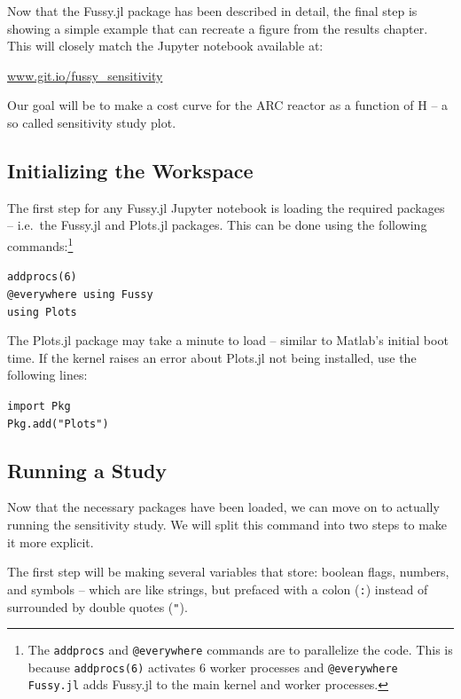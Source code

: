 Now that the Fussy.jl package has been described in detail, the final step is showing a simple example that can recreate a figure from the results chapter. This will closely match the Jupyter notebook available at:

{\centering \href{https://git.io/fussy_sensitivity}{www.git.io/fussy\_sensitivity} \par }

Our goal will be to make a cost curve for the ARC reactor as a function of H -- a so called sensitivity study plot.

\subsection{Initializing the Workspace}

The first step for any Fussy.jl Jupyter notebook is loading the required packages -- i.e.\ the Fussy.jl and Plots.jl packages. This can be done using the following commands:\footnote{The \texttt{addprocs} and \texttt{@everywhere} commands are to parallelize the code. This is because \texttt{addprocs(6)} activates 6 worker processes and \texttt{@everywhere Fussy.jl} adds Fussy.jl to the main kernel and worker processes.}

\begin{addmargin}[1.5em]{1.5em}
\texttt{addprocs(6) \\
@everywhere using Fussy \\
using Plots
}
\end{addmargin}

The Plots.jl package may take a minute to load -- similar to Matlab's initial boot time. If the kernel raises an error about Plots.jl not being installed, use the following lines:

\begin{addmargin}[1.5em]{1.5em}
\texttt{import Pkg \\
Pkg.add("Plots")
}
\end{addmargin}

\subsection{Running a Study}

Now that the necessary packages have been loaded, we can move on to actually running the sensitivity study. We will split this command into two steps to make it more explicit.

The first step will be making several variables that store: boolean flags, numbers, and symbols -- which are like strings, but prefaced with a colon (\texttt{:}) instead of surrounded by double quotes (\texttt{"}).

